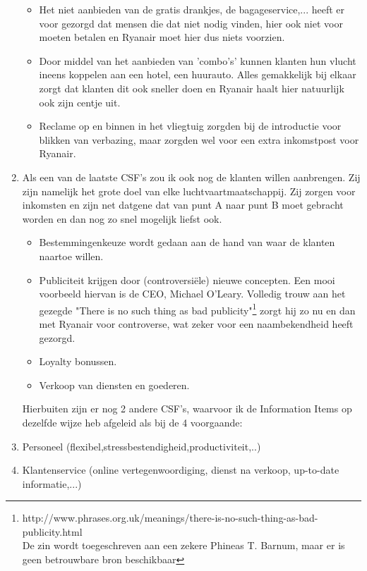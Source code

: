 \documentclass{article}
\begin{document}
\begin{enumerate}
\begin{itemize}
\item Het niet aanbieden van de gratis drankjes, de bagageservice,... heeft er voor gezorgd dat mensen die dat niet nodig vinden, hier ook niet voor moeten betalen en Ryanair moet hier dus niets voorzien. 
\item Door middel van het aanbieden van 'combo's' kunnen klanten hun vlucht ineens koppelen aan een hotel, een huurauto. Alles gemakkelijk bij elkaar zorgt dat klanten dit ook sneller doen en Ryanair haalt hier natuurlijk ook zijn centje uit.
\item Reclame op en binnen in het vliegtuig zorgden bij de introductie voor blikken van verbazing, maar zorgden wel voor een extra inkomstpost voor Ryanair.
\end{itemize}

\item Als een van de laatste CSF's zou ik ook nog de klanten willen aanbrengen. Zij zijn namelijk het grote doel van elke luchtvaartmaatschappij. Zij zorgen voor inkomsten en zijn net datgene dat van punt A naar punt B moet gebracht worden en dan nog zo snel mogelijk liefst ook.
\begin{itemize}
\item Bestemmingenkeuze wordt gedaan aan de hand van waar de klanten naartoe willen.
\item Publiciteit krijgen door (controversi\"ele) nieuwe concepten.
Een mooi voorbeeld hiervan is de CEO, Michael O'Leary. Volledig trouw aan het gezegde "There is no such thing as bad publicity"\footnote{http://www.phrases.org.uk/meanings/there-is-no-such-thing-as-bad-publicity.html \\
De zin wordt toegeschreven aan een zekere Phineas T. Barnum, maar er is geen betrouwbare bron beschikbaar} zorgt hij zo nu en dan met Ryanair voor controverse, wat zeker voor een naambekendheid heeft gezorgd.
\item Loyalty bonussen.
\item Verkoop van diensten en goederen.
\end{itemize}

Hierbuiten zijn er nog 2 andere CSF's, waarvoor ik de Information Items op dezelfde wijze heb afgeleid als bij de 4 voorgaande:
\item Personeel (flexibel,stressbestendigheid,productiviteit,..)
\item Klantenservice (online vertegenwoordiging, dienst na verkoop, up-to-date informatie,...)
\end{enumerate}
\end{document}
